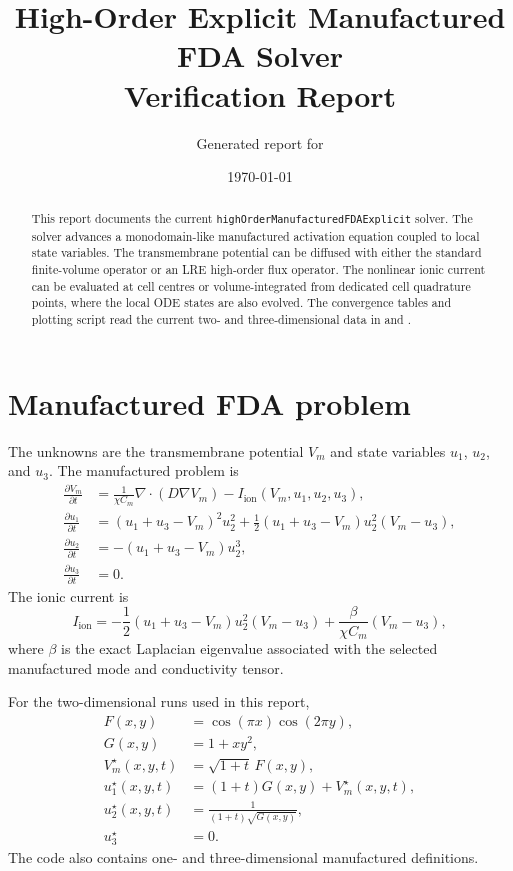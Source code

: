 \documentclass[11pt,a4paper]{article}
\title{High-Order Explicit Manufactured FDA Solver\\Verification Report}
\author{Generated report for \code{highOrderManufacturedFDAExplicit}}
\date{\today}
\newcommand{\code}[1]{\texttt{#1}}
\begin{document}
\maketitle

\begin{abstract}
This report documents the current \code{highOrderManufacturedFDAExplicit} solver. The solver advances a monodomain-like manufactured activation equation coupled to local state variables. The transmembrane potential can be diffused with either the standard finite-volume operator or an LRE high-order flux operator. The nonlinear ionic current can be evaluated at cell centres or volume-integrated from dedicated cell quadrature points, where the local ODE states are also evolved. The convergence tables and plotting script read the current two- and three-dimensional data in  and .
\end{abstract}

\section{Manufactured FDA problem}
The unknowns are the transmembrane potential $V_m$ and state variables $u_1$, $u_2$, and $u_3$. The manufactured problem is
\begin{align}
\frac{\partial V_m}{\partial t}
&= \frac{1}{\chi C_m}\nabla\cdot(D\nabla V_m)
- I_{\mathrm{ion}}(V_m,u_1,u_2,u_3),\\
\frac{\partial u_1}{\partial t}
&= (u_1+u_3-V_m)^2u_2^2
+ \frac{1}{2}(u_1+u_3-V_m)u_2^2(V_m-u_3),\\
\frac{\partial u_2}{\partial t}
&= -(u_1+u_3-V_m)u_2^3,\\
\frac{\partial u_3}{\partial t}
&= 0.
\end{align}
The ionic current is
\begin{equation}
I_{\mathrm{ion}}
= -\frac{1}{2}(u_1+u_3-V_m)u_2^2(V_m-u_3)
+ \frac{\beta}{\chi C_m}(V_m-u_3),
\end{equation}
where $\beta$ is the exact Laplacian eigenvalue associated with the selected manufactured mode and conductivity tensor.

For the two-dimensional runs used in this report,
\begin{align}
F(x,y) &= \cos(\pi x)\cos(2\pi y),\\
G(x,y) &= 1 + x y^2,\\
V_m^\star(x,y,t) &= \sqrt{1+t}\,F(x,y),\\
u_1^\star(x,y,t) &= (1+t)G(x,y) + V_m^\star(x,y,t),\\
u_2^\star(x,y,t) &= \frac{1}{(1+t)\sqrt{G(x,y)}},\\
u_3^\star &= 0.
\end{align}
The code also contains one- and three-dimensional manufactured definitions.
\end{document}

